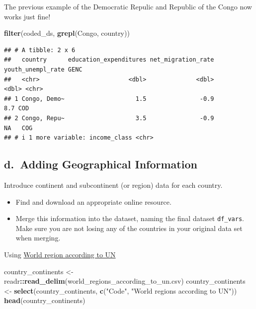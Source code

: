 \documentclass[
]{article}
\newenvironment{Shaded}{\begin{snugshade}}{\end{snugshade}}
\newcommand{\FunctionTok}[1]{\textcolor[rgb]{0.13,0.29,0.53}{\textbf{#1}}}
\newcommand{\NormalTok}[1]{#1}
\newcommand{\OtherTok}[1]{\textcolor[rgb]{0.56,0.35,0.01}{#1}}
\newcommand{\SpecialCharTok}[1]{\textcolor[rgb]{0.81,0.36,0.00}{\textbf{#1}}}
\newcommand{\StringTok}[1]{\textcolor[rgb]{0.31,0.60,0.02}{#1}}
\providecommand{\tightlist}{%
  \setlength{\itemsep}{0pt}\setlength{\parskip}{0pt}}
\begin{document}
The previous example of the Democratic Repulic and Republic of the Congo
now works just fine!

\begin{Shaded}
\begin{Highlighting}[]
\FunctionTok{filter}\NormalTok{(coded\_ds, }\FunctionTok{grepl}\NormalTok{(}\StringTok{\textquotesingle{}Congo\textquotesingle{}}\NormalTok{, country))}
\end{Highlighting}
\end{Shaded}

\begin{verbatim}
## # A tibble: 2 x 6
##   country      education_expenditures net_migration_rate youth_unempl_rate GENC 
##   <chr>                         <dbl>              <dbl>             <dbl> <chr>
## 1 Congo, Demo~                    1.5               -0.9               8.7 COD  
## 2 Congo, Repu~                    3.5               -0.9              NA   COG  
## # i 1 more variable: income_class <chr>
\end{verbatim}

\subsection{d.~Adding Geographical
Information}\label{d.-adding-geographical-information}

Introduce continent and subcontinent (or region) data for each country.

\begin{itemize}
\tightlist
\item
  Find and download an appropriate online resource.
\item
  Merge this information into the dataset, naming the final dataset
  \texttt{df\_vars}. Make sure you are not losing any of the countries
  in your original data set when merging.
\end{itemize}

Using
\href{https://ourworldindata.org/grapher/world-regions-according-to-un?tab=table}{World
region according to UN}

\begin{Shaded}
\begin{Highlighting}[]
\NormalTok{country\_continents }\OtherTok{\textless{}{-}}\NormalTok{ readr}\SpecialCharTok{::}\FunctionTok{read\_delim}\NormalTok{(}\StringTok{\textquotesingle{}world\_regions\_according\_to\_un.csv\textquotesingle{}}\NormalTok{)}
\NormalTok{country\_continents }\OtherTok{\textless{}{-}} \FunctionTok{select}\NormalTok{(country\_continents, }\FunctionTok{c}\NormalTok{(}\StringTok{"Code"}\NormalTok{, }\StringTok{"World regions according to UN"}\NormalTok{))}
\FunctionTok{head}\NormalTok{(country\_continents)}
\end{Highlighting}
\end{Shaded}
\end{document}

